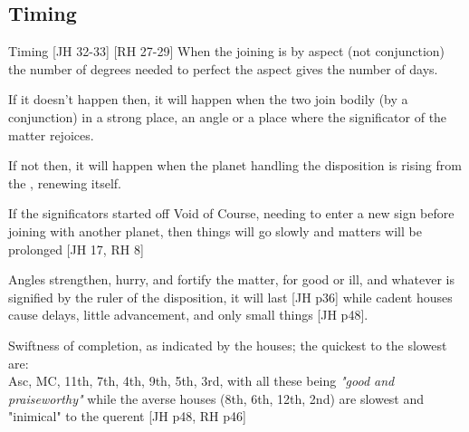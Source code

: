 \subsection{Timing}
\begin{frame}[t]{Timing  [JH 32-33] [RH 27-29]}
When the joining is by aspect (not conjunction) the number of degrees needed to perfect the aspect gives the number of days.

If it doesn't happen then, it will happen when the two join bodily (by a conjunction) in a strong place, an angle or a place where the significator of the matter rejoices.

If not then, it will happen when the planet handling the disposition is rising from the \Sun, renewing itself.

If the significators started off Void of Course, needing to enter a new sign before joining with  another planet, then things will go slowly and matters will be prolonged [JH 17, RH 8]

Angles strengthen, hurry, and fortify the matter, for good or ill, and whatever is signified by the ruler of the disposition, it will last [JH p36] while cadent houses cause delays, little advancement, and only small things [JH p48].

Swiftness of completion, as indicated by the houses; the quickest to the slowest are: \\
Asc, MC, 11th, 7th, 4th, 9th, 5th, 3rd,  with all these being \textsl{"good and praiseworthy"} while the averse houses (8th, 6th, 12th, 2nd) are slowest and "inimical" to the querent [JH p48, RH p46]

\end{frame}